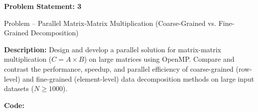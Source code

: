 \documentclass[12pt]{article}
\begin{document}
\newpage


\textbf{Problem Statement: 3}

Problem -- Parallel Matrix-Matrix Multiplication (Coarse-Grained vs. Fine-Grained Decomposition)

\vspace{0.2cm}
\textbf{Description:} Design and develop a parallel solution for matrix-matrix multiplication ($C = A \times B$) on large matrices using OpenMP. Compare and contrast the performance, speedup, and parallel efficiency of coarse-grained (row-level) and fine-grained (element-level) data decomposition methods on large input datasets ($N \ge 1000$).

\vspace{0.3cm}
\textbf{Code:}
\end{document}
